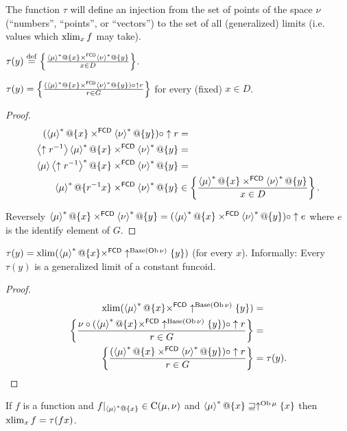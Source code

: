 The function $\tau$ will define an injection from the set of points
of the space $\nu$ (``numbers'', ``points'', or ``vectors'')
to the set of all (generalized) limits (i.e. values which $\operatorname{xlim}_{x}f$
may take).
\begin{defn}
$\tau(y)\overset{\mathrm{def}}{=}\left\{ \frac{\left\langle \mu\right\rangle ^{\ast}@\{x\}\times^{\mathsf{FCD}}\left\langle \nu\right\rangle ^{\ast}@\{y\}}{x\in D}\right\}$.\end{defn}
\begin{prop}
$\tau(y)=\left\{ \frac{(\left\langle \mu\right\rangle ^{\ast}@\{x\}\times^{\mathsf{FCD}}\left\langle \nu\right\rangle ^{\ast}@\{y\})\circ\uparrow r}{r\in G}\right\}$
for every (fixed) $x\in D$.\end{prop}
\begin{proof}
~
\begin{align*}
(\left\langle \mu\right\rangle ^{\ast}@\{x\}\times^{\mathsf{FCD}}\left\langle \nu\right\rangle ^{\ast}@\{y\})\circ\uparrow r & =\\
\left\langle \uparrow r^{-1}\right\rangle\left\langle \mu\right\rangle ^{\ast}@\{x\}\times^{\mathsf{FCD}}\left\langle \nu\right\rangle ^{\ast}@\{y\} & =\\
\left\langle \mu\right\rangle\left\langle \uparrow r^{-1}\right\rangle ^{\ast}@\{x\}\times^{\mathsf{FCD}}\left\langle \nu\right\rangle ^{\ast}@\{y\} & =\\
\left\langle \mu\right\rangle ^{\ast}@\{r^{-1}x\}\times^{\mathsf{FCD}}\left\langle \nu\right\rangle ^{\ast}@\{y\} & \in \left\{ \frac{\left\langle \mu\right\rangle ^{\ast}@\{x\}\times^{\mathsf{FCD}}\left\langle \nu\right\rangle ^{\ast}@\{y\}}{x\in D}\right\}.
\end{align*}


Reversely $\left\langle \mu\right\rangle ^{\ast}@\{x\}\times^{\mathsf{FCD}}\left\langle \nu\right\rangle ^{\ast}@\{y\}=(\left\langle \mu\right\rangle ^{\ast}@\{x\}\times^{\mathsf{FCD}}\left\langle \nu\right\rangle ^{\ast}@\{y\})\circ\uparrow e$
where $e$ is the identify element of $G$.\end{proof}
\begin{prop}
$\tau(y)=\operatorname{xlim}(\left\langle \mu\right\rangle ^{\ast}@\{x\}\times^{\mathsf{FCD}}\uparrow^{\operatorname{Base}(\operatorname{Ob}\nu)}\{y\})$
(for every $x$). Informally: Every $\tau(y)$ is a generalized limit
of a constant funcoid.\end{prop}
\begin{proof}
~
\begin{align*}
\operatorname{xlim}(\left\langle \mu\right\rangle ^{\ast}@\{x\}\times^{\mathsf{FCD}}\uparrow^{\operatorname{Base}(\operatorname{Ob}\nu)}\{y\}) & =\\
\left\{ \frac{\nu\circ(\left\langle \mu\right\rangle ^{\ast}@\{x\}\times^{\mathsf{FCD}}\uparrow^{\operatorname{Base}(\operatorname{Ob}\nu)}\{y\})\circ\uparrow r}{r\in G}\right\} & =\\
\left\{ \frac{(\left\langle \mu\right\rangle ^{\ast}@\{x\}\times^{\mathsf{FCD}}\left\langle \nu\right\rangle ^{\ast}@\{y\})\circ\uparrow r}{r\in G}\right\} & =\tau(y).
\end{align*}
\end{proof}
\begin{thm}
If $f$ is a function and $f|_{\left\langle \mu\right\rangle ^{\ast}@\{x\}}\in\mathrm{C}(\mu,\nu)$
and $\left\langle \mu\right\rangle ^{\ast}@\{x\}\sqsupseteq\uparrow^{\operatorname{Ob}\mu}\{x\}$
then $\operatorname{xlim}_{x}f=\tau(fx)$.\end{thm}
